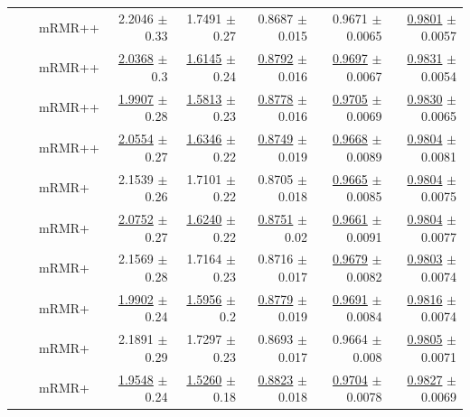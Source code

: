 \begin{longtable}{llp{}rrrrr}
 &  & mRMR++ & 2.2046 {\scriptsize $\pm$ 0.33} & 1.7491 {\scriptsize $\pm$ 0.27} & 0.8687 {\scriptsize $\pm$ 0.015} & 0.9671 {\scriptsize $\pm$ 0.0065} & \underline{0.9801} {\scriptsize $\pm$ 0.0057} \\
 &  & mRMR++ & \underline{2.0368} {\scriptsize $\pm$ 0.3} & \underline{1.6145} {\scriptsize $\pm$ 0.24} & \underline{0.8792} {\scriptsize $\pm$ 0.016} & \underline{0.9697} {\scriptsize $\pm$ 0.0067} & \underline{0.9831} {\scriptsize $\pm$ 0.0054} \\
 &  & mRMR++ & \underline{1.9907} {\scriptsize $\pm$ 0.28} & \underline{1.5813} {\scriptsize $\pm$ 0.23} & \underline{0.8778} {\scriptsize $\pm$ 0.016} & \underline{0.9705} {\scriptsize $\pm$ 0.0069} & \underline{0.9830} {\scriptsize $\pm$ 0.0065} \\
 &  & mRMR++ & \underline{2.0554} {\scriptsize $\pm$ 0.27} & \underline{1.6346} {\scriptsize $\pm$ 0.22} & \underline{0.8749} {\scriptsize $\pm$ 0.019} & \underline{0.9668} {\scriptsize $\pm$ 0.0089} & \underline{0.9804} {\scriptsize $\pm$ 0.0081} \\
 &  & mRMR+ & 2.1539 {\scriptsize $\pm$ 0.26} & 1.7101 {\scriptsize $\pm$ 0.22} & 0.8705 {\scriptsize $\pm$ 0.018} & \underline{0.9665} {\scriptsize $\pm$ 0.0085} & \underline{0.9804} {\scriptsize $\pm$ 0.0075} \\
 &  & mRMR+ & \underline{2.0752} {\scriptsize $\pm$ 0.27} & \underline{1.6240} {\scriptsize $\pm$ 0.22} & \underline{0.8751} {\scriptsize $\pm$ 0.02} & \underline{0.9661} {\scriptsize $\pm$ 0.0091} & \underline{0.9804} {\scriptsize $\pm$ 0.0077} \\
 &  & mRMR+ & 2.1569 {\scriptsize $\pm$ 0.28} & 1.7164 {\scriptsize $\pm$ 0.23} & 0.8716 {\scriptsize $\pm$ 0.017} & \underline{0.9679} {\scriptsize $\pm$ 0.0082} & \underline{0.9803} {\scriptsize $\pm$ 0.0074} \\
 &  & mRMR+ & \underline{1.9902} {\scriptsize $\pm$ 0.24} & \underline{1.5956} {\scriptsize $\pm$ 0.2} & \underline{0.8779} {\scriptsize $\pm$ 0.019} & \underline{0.9691} {\scriptsize $\pm$ 0.0084} & \underline{0.9816} {\scriptsize $\pm$ 0.0074} \\
 &  & mRMR+ & 2.1891 {\scriptsize $\pm$ 0.29} & 1.7297 {\scriptsize $\pm$ 0.23} & 0.8693 {\scriptsize $\pm$ 0.017} & 0.9664 {\scriptsize $\pm$ 0.008} & \underline{0.9805} {\scriptsize $\pm$ 0.0071} \\
 &  & mRMR+ & \underline{1.9548} {\scriptsize $\pm$ 0.24} & \underline{1.5260} {\scriptsize $\pm$ 0.18} & \underline{0.8823} {\scriptsize $\pm$ 0.018} & \underline{0.9704} {\scriptsize $\pm$ 0.0078} & \underline{0.9827} {\scriptsize $\pm$ 0.0069} \\

\end{longtable}
